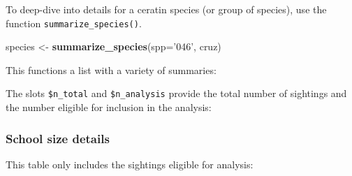 \documentclass[
]{book}
\newenvironment{Shaded}{\begin{snugshade}}{\end{snugshade}}
\newcommand{\DataTypeTok}[1]{\textcolor[rgb]{0.13,0.29,0.53}{#1}}
\newcommand{\DecValTok}[1]{\textcolor[rgb]{0.00,0.00,0.81}{#1}}
\newcommand{\KeywordTok}[1]{\textcolor[rgb]{0.13,0.29,0.53}{\textbf{#1}}}
\newcommand{\NormalTok}[1]{#1}
\newcommand{\OperatorTok}[1]{\textcolor[rgb]{0.81,0.36,0.00}{\textbf{#1}}}
\newcommand{\StringTok}[1]{\textcolor[rgb]{0.31,0.60,0.02}{#1}}
\begin{document}
To deep-dive into details for a ceratin species (or group of species), use the function \texttt{summarize\_species()}.

\begin{Shaded}
\begin{Highlighting}[]
\NormalTok{species <-}\StringTok{ }\KeywordTok{summarize_species}\NormalTok{(}\DataTypeTok{spp=}\StringTok{'046'}\NormalTok{, cruz)}
\end{Highlighting}
\end{Shaded}

This functions a list with a variety of summaries:

\begin{Shaded}
\end{Shaded}

The slots \texttt{\$n\_total} and \texttt{\$n\_analysis} provide the total number of sightings and the number eligible for inclusion in the analysis:

\begin{Shaded}
\end{Shaded}

\hypertarget{school-size-details}{%
\subsubsection*{School size details}\label{school-size-details}}

This table only includes the sightings eligible for analysis:
\end{document}
